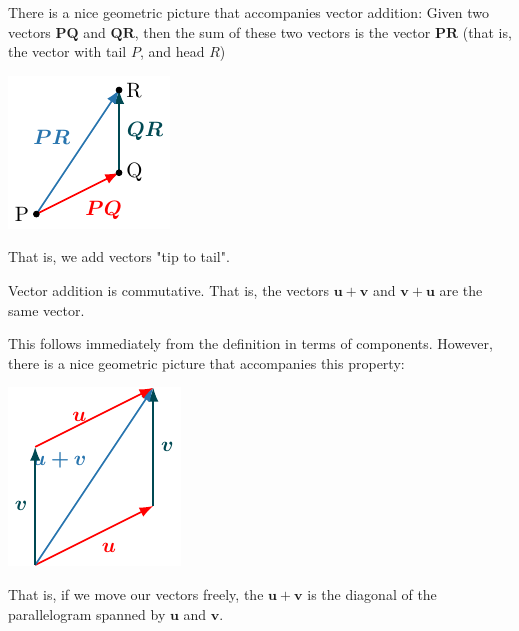 \begin{example}
    There is a nice geometric picture that accompanies vector addition:  Given two vectors $\bm{PQ}$ and $\bm{QR}$, then the sum of these two vectors is the vector $\bm{PR}$ (that is, the vector with tail $P$, and head $R$)
    

 \begin{center}        
        \includegraphics{chapters/1-LinearAlgebra/figures/figures-vectoraddition.pdf}
    \end{center}
        
    That is, we add vectors "tip to tail".
\end{example}


\begin{proposition}
    Vector addition is commutative.  That is, the vectors $\bm{u+v}$ and $\bm{v+u}$ are the same vector.
\end{proposition}

\begin{example}
    This follows immediately from the definition in terms of components.  However, there is a nice geometric picture that accompanies this property:
    
    
    
 \begin{center}        
        \includegraphics{chapters/1-LinearAlgebra/figures/figures-vectoradditioncommutative.pdf}
    \end{center}
        
    That is, if we move our vectors freely, the $\bm{u+v}$ is the diagonal of the parallelogram spanned by $\bm{u}$ and $\bm{v}$.
\end{example}

